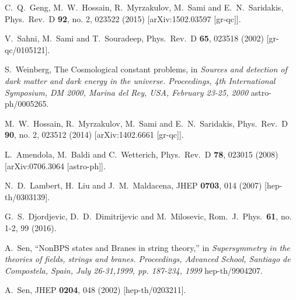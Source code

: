 \documentclass[prd,twocolumn,superscriptaddress]{revtex4}
\begin{document}
\begin{thebibliography}{99}
  C.~Q.~Geng, M.~W.~Hossain, R.~Myrzakulov, M.~Sami and E.~N.~Saridakis,
  Phys.\ Rev.\ D {\bf 92}, no. 2, 023522 (2015)
  [arXiv:1502.03597 [gr-qc]].
  
  V.~Sahni, M.~Sami and T.~Souradeep,
  Phys.\ Rev.\ D {\bf 65}, 023518 (2002)
  [gr-qc/0105121].
  
  S.~Weinberg, The Cosmological constant problems,  in  { \it Sources and detection of dark matter and dark energy in
                        the universe. Proceedings, 4th International Symposium, DM
                        2000, Marina del Rey, USA, February 23-25, 2000}
  astro-ph/0005265.
  
  M.~W.~Hossain, R.~Myrzakulov, M.~Sami and E.~N.~Saridakis,
  Phys.\ Rev.\ D {\bf 90}, no. 2, 023512 (2014)
  [arXiv:1402.6661 [gr-qc]].
  
  L.~Amendola, M.~Baldi and C.~Wetterich,
  Phys.\ Rev.\ D {\bf 78}, 023015 (2008)
  [arXiv:0706.3064 [astro-ph]].
  
  N.~D.~Lambert, H.~Liu and J.~M.~Maldacena,
  JHEP {\bf 0703}, 014 (2007)
  [hep-th/0303139].
  
  G.~S.~Djordjevic, D.~D.~Dimitrijevic and M.~Milosevic,
  Rom.\ J.\ Phys.\  {\bf 61}, no. 1-2, 99 (2016).
  
  A.~Sen,
  ``NonBPS states and Branes in string theory,'' in
  {\it Supersymmetry in the theories of fields, strings and
      branes. Proceedings, Advanced School, Santiago de  Compostela, Spain, July 26-31,1999,  pp. 187-234, 1999}
  hep-th/9904207.
  
  A.~Sen,
  JHEP {\bf 0204}, 048 (2002)
  [hep-th/0203211].
  

\end{thebibliography}
\end{document}

